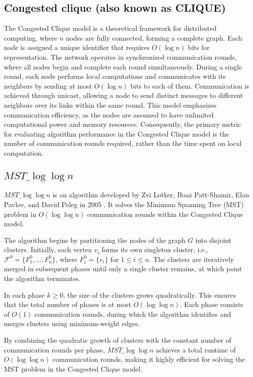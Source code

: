 \documentclass[english, 12pt, a4paper, elec, utf8, a-2b, online]{aaltothesis}
\newcommand{\mstalgo}{$MST\_\log\log{n}$}
\begin{document}
\subsection{Congested clique (also known as CLIQUE)}
The Congested Clique model is a theoretical framework for distributed computing, where \( n \) nodes are fully connected, forming a complete graph. Each node is assigned a unique identifier that requires \( O(\log{n}) \) bits for representation. The network operates in synchronized communication rounds, where all nodes begin and complete each round simultaneously. During a single round, each node performs local computations and communicates with its neighbors by sending at most \( O(\log{n}) \) bits to each of them. Communication is achieved through unicast, allowing a node to send distinct messages to different neighbors over its links within the same round. This model emphasizes communication efficiency, as the nodes are assumed to have unlimited computational power and memory resources. Consequently, the primary metric for evaluating algorithm performance in the Congested Clique model is the number of communication rounds required, rather than the time spent on local computation. \cite{powerCongestClique}
\subsection{\mstalgo{}}
\label{sec:mst_algo}
\mstalgo{} is an algorithm developed by Zvi Lotker, Boaz Patt-Shamir, Elan Pavlov, and David Peleg in 2005 \cite{MSTLogLogn}. It solves the Minimum Spanning Tree (MST) problem in $O(\log{\log{n}})$ communication rounds within the Congested Clique model.

The algorithm begins by partitioning the nodes of the graph \( G \) into disjoint clusters. Initially, each vertex \( v_i \) forms its own singleton cluster, i.e., \( \mathcal{F}^0 = \{ F_1^0, \dots, F_n^0 \} \), where \( F_i^0 = \{ v_i \} \) for \( 1 \leq i \leq n \). The clusters are iteratively merged in subsequent phases until only a single cluster remains, at which point the algorithm terminates.

In each phase \( k \geq 0 \), the size of the clusters grows quadratically. This ensures that the total number of phases is at most \( O(\log \log n) \). Each phase consists of \( O(1) \) communication rounds, during which the algorithm identifies and merges clusters using minimum-weight edges.

By combining the quadratic growth of clusters with the constant number of communication rounds per phase, \mstalgo{} achieves a total runtime of \( O(\log \log n) \) communication rounds, making it highly efficient for solving the MST problem in the Congested Clique model.
\end{document}
